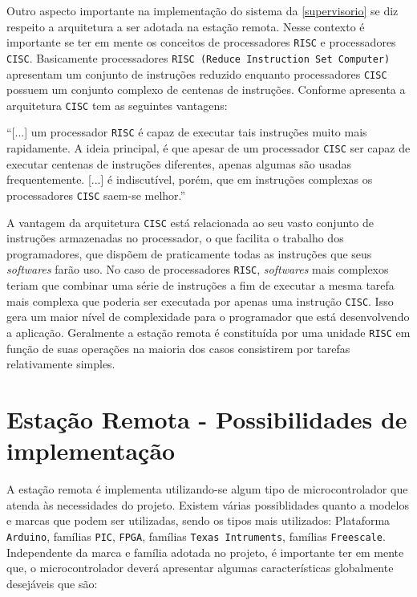 Outro aspecto importante na implementação do sistema da \autoref{supervisorio} se diz respeito a arquitetura a ser 
adotada na estação remota. Nesse contexto é importante se ter em mente os conceitos de processadores \texttt{RISC} e 
processadores \texttt{CISC}. Basicamente processadores \texttt{RISC (Reduce Instruction Set Computer)} apresentam um 
conjunto de instruções reduzido enquanto processadores \texttt{CISC} possuem um conjunto complexo de centenas de instruções. Conforme apresenta \cite[p.~1]{marimoto2007} a arquitetura \texttt{CISC} tem as seguintes vantagens:

\begin{citacao}
``[...] um processador \texttt{RISC} é capaz de executar tais instruções muito mais
rapidamente. A ideia principal, é que apesar de um processador \texttt{CISC} ser capaz de
executar centenas de instruções diferentes, apenas algumas são usadas
frequentemente. [...] é indiscutível, porém, que em instruções complexas os
processadores \texttt{CISC} saem-se melhor.''
\end{citacao}

A vantagem da arquitetura \texttt{CISC} está relacionada ao seu vasto conjunto de instruções armazenadas no processador, o que facilita o trabalho 
dos programadores, que dispõem de praticamente todas as instruções que seus \textit{softwares} farão uso. No caso de processadores \texttt{RISC}, 
\textit{softwares} mais complexos teriam que combinar uma série de instruções a fim de executar a mesma tarefa mais complexa que poderia ser executada
por apenas uma instrução \texttt{CISC}. Isso gera um maior nível de complexidade para o programador que está desenvolvendo a aplicação. 
Geralmente a estação remota é constituída por uma unidade \texttt{RISC} em função de suas operações na maioria dos casos consistirem por 
tarefas relativamente simples.


\section{Estação Remota - Possibilidades de implementação}

A estação remota é implementa utilizando-se algum tipo de microcontrolador que atenda às necessidades do projeto. 
Existem várias possiblidades quanto a modelos e marcas que podem ser utilizadas, sendo os tipos mais utilizados:
Plataforma \texttt{Arduino}, famílias \texttt{PIC}, \texttt{FPGA}, famílias \texttt{Texas Intruments}, famílias \texttt{Freescale}. 
Independente da marca e família adotada no projeto, é importante ter em mente que, o microcontrolador deverá apresentar algumas 
características globalmente desejáveis que são:

